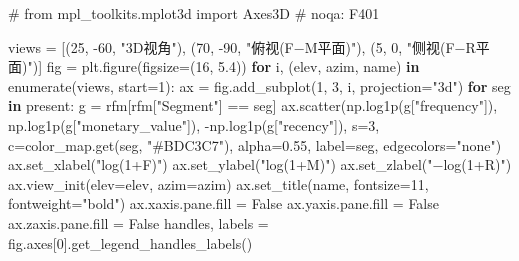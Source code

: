\documentclass[
]{ctexart}
\newenvironment{Shaded}{\begin{snugshade}}{\end{snugshade}}
\newcommand{\BuiltInTok}[1]{\textcolor[rgb]{0.00,0.23,0.31}{#1}}
\newcommand{\CommentTok}[1]{\textcolor[rgb]{0.37,0.37,0.37}{#1}}
\newcommand{\ControlFlowTok}[1]{\textcolor[rgb]{0.00,0.23,0.31}{\textbf{#1}}}
\newcommand{\DecValTok}[1]{\textcolor[rgb]{0.68,0.00,0.00}{#1}}
\newcommand{\FloatTok}[1]{\textcolor[rgb]{0.68,0.00,0.00}{#1}}
\newcommand{\KeywordTok}[1]{\textcolor[rgb]{0.00,0.23,0.31}{\textbf{#1}}}
\newcommand{\NormalTok}[1]{\textcolor[rgb]{0.00,0.23,0.31}{#1}}
\newcommand{\OperatorTok}[1]{\textcolor[rgb]{0.37,0.37,0.37}{#1}}
\newcommand{\StringTok}[1]{\textcolor[rgb]{0.13,0.47,0.30}{#1}}
\newcommand{\VariableTok}[1]{\textcolor[rgb]{0.07,0.07,0.07}{#1}}
\newcounter{none} %
\begin{document}
\begin{Shaded}
\begin{Highlighting}[]
\CommentTok{\# from mpl\_toolkits.mplot3d import Axes3D  \# noqa: F401}

\NormalTok{views }\OperatorTok{=}\NormalTok{ [(}\DecValTok{25}\NormalTok{, }\OperatorTok{{-}}\DecValTok{60}\NormalTok{, }\StringTok{"3D视角"}\NormalTok{), (}\DecValTok{70}\NormalTok{, }\OperatorTok{{-}}\DecValTok{90}\NormalTok{, }\StringTok{"俯视(F−M平面)"}\NormalTok{), (}\DecValTok{5}\NormalTok{, }\DecValTok{0}\NormalTok{, }\StringTok{"侧视(F−R平面)"}\NormalTok{)]}
\NormalTok{fig }\OperatorTok{=}\NormalTok{ plt.figure(figsize}\OperatorTok{=}\NormalTok{(}\DecValTok{16}\NormalTok{, }\FloatTok{5.4}\NormalTok{))}
\ControlFlowTok{for}\NormalTok{ i, (elev, azim, name) }\KeywordTok{in} \BuiltInTok{enumerate}\NormalTok{(views, start}\OperatorTok{=}\DecValTok{1}\NormalTok{):}
\NormalTok{    ax }\OperatorTok{=}\NormalTok{ fig.add\_subplot(}\DecValTok{1}\NormalTok{, }\DecValTok{3}\NormalTok{, i, projection}\OperatorTok{=}\StringTok{"3d"}\NormalTok{)}
    \ControlFlowTok{for}\NormalTok{ seg }\KeywordTok{in}\NormalTok{ present:}
\NormalTok{        g }\OperatorTok{=}\NormalTok{ rfm[rfm[}\StringTok{"Segment"}\NormalTok{] }\OperatorTok{==}\NormalTok{ seg]}
\NormalTok{        ax.scatter(np.log1p(g[}\StringTok{"frequency"}\NormalTok{]), np.log1p(g[}\StringTok{"monetary\_value"}\NormalTok{]), }\OperatorTok{{-}}\NormalTok{np.log1p(g[}\StringTok{"recency"}\NormalTok{]),}
\NormalTok{                   s}\OperatorTok{=}\DecValTok{3}\NormalTok{, c}\OperatorTok{=}\NormalTok{color\_map.get(seg, }\StringTok{"\#BDC3C7"}\NormalTok{), alpha}\OperatorTok{=}\FloatTok{0.55}\NormalTok{,}
\NormalTok{                   label}\OperatorTok{=}\NormalTok{seg, edgecolors}\OperatorTok{=}\StringTok{"none"}\NormalTok{)}
\NormalTok{    ax.set\_xlabel(}\StringTok{"log(1+F)"}\NormalTok{)}
\NormalTok{    ax.set\_ylabel(}\StringTok{"log(1+M)"}\NormalTok{)}
\NormalTok{    ax.set\_zlabel(}\StringTok{"−log(1+R)"}\NormalTok{)}
\NormalTok{    ax.view\_init(elev}\OperatorTok{=}\NormalTok{elev, azim}\OperatorTok{=}\NormalTok{azim)}
\NormalTok{    ax.set\_title(name, fontsize}\OperatorTok{=}\DecValTok{11}\NormalTok{, fontweight}\OperatorTok{=}\StringTok{"bold"}\NormalTok{)}
\NormalTok{    ax.xaxis.pane.fill }\OperatorTok{=} \VariableTok{False}
\NormalTok{    ax.yaxis.pane.fill }\OperatorTok{=} \VariableTok{False}
\NormalTok{    ax.zaxis.pane.fill }\OperatorTok{=} \VariableTok{False}
\NormalTok{handles, labels }\OperatorTok{=}\NormalTok{ fig.axes[}\DecValTok{0}\NormalTok{].get\_legend\_handles\_labels()}

\end{Highlighting}
\end{Shaded}
\end{document}
